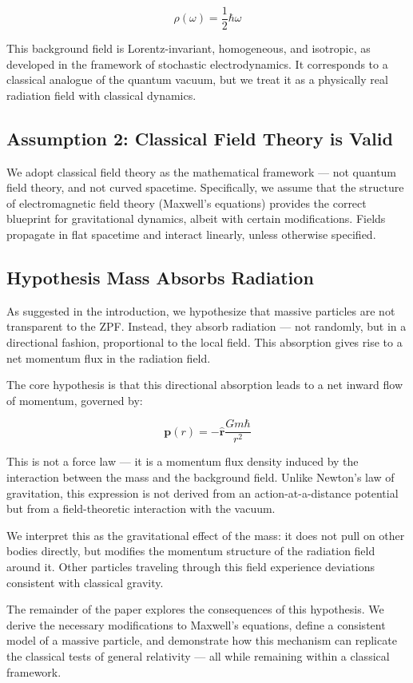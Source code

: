 \documentclass {article}
\renewcommand\vec{\mathbf}
\let\OldHat\hat
\renewcommand{\hat}[1]{\OldHat{\mathbf{#1}}}
\begin{document}
\[
\rho(\omega) = \frac{1}{2} \hbar \omega
\]

This background field is Lorentz-invariant, homogeneous, and isotropic, as developed in the framework of stochastic electrodynamics. It corresponds to a classical analogue of the quantum vacuum, but we treat it as a physically real radiation field with classical dynamics.

\subsection{Assumption 2: Classical Field Theory is Valid}

We adopt classical field theory as the mathematical framework — not quantum field theory, and not curved spacetime. Specifically, we assume that the structure of electromagnetic field theory (Maxwell’s equations) provides the correct blueprint for gravitational dynamics, albeit with certain modifications. Fields propagate in flat spacetime and interact linearly, unless otherwise specified.

\subsection{Hypothesis Mass Absorbs Radiation}

As suggested in the introduction, we hypothesize that massive particles are not transparent to the ZPF. Instead, they absorb radiation — not randomly, but in a directional fashion, proportional to the local field. This absorption gives rise to a net momentum flux in the radiation field.

The core hypothesis is that this directional absorption leads to a net inward flow of momentum, governed by:

\[
\boxed{
	\vec{p}(r) = -\hat{r} \frac{G m \hbar}{r^2}
}
\]

This is not a force law — it is a momentum flux density induced by the interaction between the mass and the background field. Unlike Newton’s law of gravitation, this expression is not derived from an action-at-a-distance potential but from a field-theoretic interaction with the vacuum.

We interpret this as the gravitational effect of the mass: it does not pull on other bodies directly, but modifies the momentum structure of the radiation field around it. Other particles traveling through this field experience deviations consistent with classical gravity.

The remainder of the paper explores the consequences of this hypothesis. We derive the necessary modifications to Maxwell’s equations, define a consistent model of a massive particle, and demonstrate how this mechanism can replicate the classical tests of general relativity — all while remaining within a classical framework.
\end{document}
